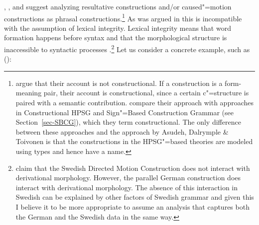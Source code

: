 \citet{GJ2004a}, \citet{Alsina96a}, and \citet*{ADT2008a,ADT2013a} suggest analyzing resultative
constructions and/or caused"=motion constructions as phrasal constructions.\footnote{%
\citet[Section~2.3]{AT2014a} argue that their account is not constructional. If a construction is a
form-meaning pair, their account is constructional, since a certain c"=structure is paired with a
semantic contribution. \citet[Section~2.2]{AT2014a} compare their approach with approaches in Constructional
HPSG \citep{Sag97a} and Sign"=Based Construction Grammar (see Section~\ref{sec-SBCG}), which they term constructional. The only difference
between these approaches and the approach by Asudeh, Dalrymple \& Toivonen is that the constructions in the HPSG"=based theories are modeled using types and
hence have a name.%
} As was argued in
 this is incompatible with the assumption of lexical integrity. Lexical
integrity means that word formation happens before syntax and that the morphological structure is inaccessible to
syntactic processes \citep{BM95a}.\footnote{
  \citet[]{ADT2013a} claim that the Swedish Directed Motion Construction does not interact
  with derivational morphology. However, the parallel German construction does interact with
  derivational morphology. The absence of this interaction in Swedish can be explained by other
  factors of Swedish grammar and given this I believe it to be more appropriate to assume an
  analysis that captures both the German and the Swedish data in the same way.%
}
Let us consider a concrete example, such as ():
\eal
\label{ex-tanzt-schuhe-blutig}
